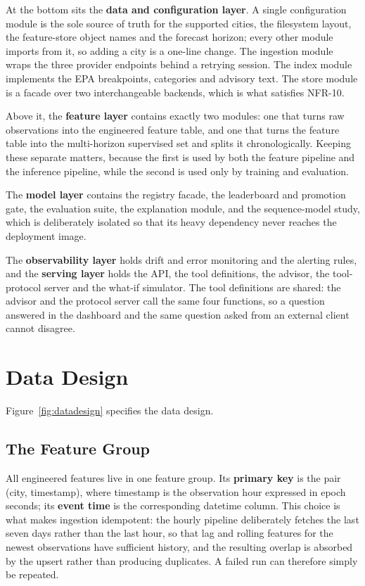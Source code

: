 
At the bottom sits the \textbf{data and configuration layer}. A single
configuration module is the sole source of truth for the supported cities, the
filesystem layout, the feature-store object names and the forecast horizon; every
other module imports from it, so adding a city is a one-line change. The
ingestion module wraps the three provider endpoints behind a retrying session.
The index module implements the EPA breakpoints, categories and advisory text.
The store module is a facade over two interchangeable backends, which is what
satisfies NFR-10.

Above it, the \textbf{feature layer} contains exactly two modules: one that turns
raw observations into the engineered feature table, and one that turns the
feature table into the multi-horizon supervised set and splits it chronologically.
Keeping these separate matters, because the first is used by both the feature
pipeline and the inference pipeline, while the second is used only by training
and evaluation.

The \textbf{model layer} contains the registry facade, the leaderboard and
promotion gate, the evaluation suite, the explanation module, and the
sequence-model study, which is deliberately isolated so that its heavy dependency
never reaches the deployment image.

The \textbf{observability layer} holds drift and error monitoring and the
alerting rules, and the \textbf{serving layer} holds the API, the tool
definitions, the advisor, the tool-protocol server and the what-if simulator. The
tool definitions are shared: the advisor and the protocol server call the same
four functions, so a question answered in the dashboard and the same question
asked from an external client cannot disagree.

\section{Data Design}
\label{sec:design-data}
Figure~\ref{fig:datadesign} specifies the data design.


\subsection{The Feature Group}
All engineered features live in one feature group. Its \textbf{primary key} is
the pair (city, timestamp), where timestamp is the observation hour expressed in
epoch seconds; its \textbf{event time} is the corresponding datetime column. This
choice is what makes ingestion idempotent: the hourly pipeline deliberately
fetches the last seven days rather than the last hour, so that lag and rolling
features for the newest observations have sufficient history, and the resulting
overlap is absorbed by the upsert rather than producing duplicates. A failed run
can therefore simply be repeated.

